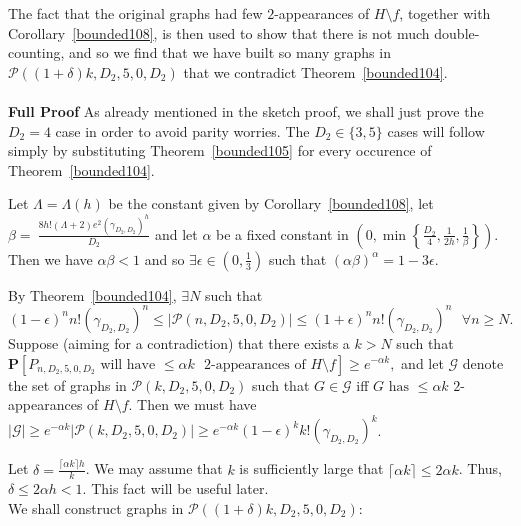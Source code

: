 \documentclass{article}
\newtheorem{Proof of Theorem}{Proof of Theorem}
\begin{document}
The fact that the original graphs had few $2$-appearances of $H \setminus f$,
together with Corollary~\ref{bounded108},
is then used to show that there is not much double-counting,
and so we find that we have built so many graphs in $\mathcal{P}((1+\delta)k,D_{2},5,0,D_{2})$
that we contradict Theorem~\ref{bounded104}. \\
\\
\textbf{Full Proof}
As already mentioned in the sketch proof,
we shall just prove the $D_{2}=4$ case in order to avoid parity worries.
The $D_{2} \in \{ 3,5 \}$ cases will follow simply by substituting Theorem~\ref{bounded105} 
for every occurence of Theorem~\ref{bounded104}.

Let $\Lambda \!=\! \Lambda(h)$ be the constant given by Corollary~\ref{bounded108},
let $\beta \!=~\!\!\frac{ 8h! (\Lambda + 2) e^{2} \left( \gamma_{D_{2},D_{2}} \right)^{h} }{D_{2}}$
and let $\alpha$ be a fixed constant in 
$\left( 0, \min \left\{ \frac{D_{2}}{4}, \frac{1}{2h}, \frac{1}{\beta} \right\} \right)$.
Then we have $\alpha \beta <1$ 
and so $\exists \epsilon \in \left( 0,\frac{1}{3} \right)$ such that $(\alpha \beta)^{\alpha} = 1-3 \epsilon$.

By Theorem~\ref{bounded104},
$\exists N$ such that
\begin{equation} \label{eq:gr2}
(1-\epsilon)^{n}n! \left( \gamma_{D_{2},D_{2}} \right)^{n}
\leq |\mathcal{P}(n,D_{2},5,0,D_{2})|
\leq (1+\epsilon)^{n}n! \left( \gamma_{D_{2},D_{2}} \right)^{n} 
\textrm{ } \forall n \geq N.
\end{equation}
Suppose (aiming for a contradiction) that there exists a $k>N$ such that 
$
\mathbf{P} [P_{n,D_{2},5,0,D_{2}} \textrm{ will have } \leq \alpha k \textrm{ $2$-appearances of } H \setminus f] 
\geq e^{-\alpha k},
$
and let $\mathcal{G}$ denote the set of graphs in $\mathcal{P}(k,D_{2},5,0,D_{2})$ such that
$G \in \mathcal{G}$ iff 
$G \textrm{ has } \leq \alpha k$ $2$-appearances of $H \setminus f$.
Then we must have 
$|\mathcal{G}| \geq e^{-\alpha k} |\mathcal{P}(k,D_{2},5,0,D_{2})| \geq 
e^{-\alpha k} (1-\epsilon)^{k}k! \left( \gamma_{D_{2},D_{2}} \right)^{k}$. 

Let $\delta = \frac{\lceil \alpha k \rceil h}{k}$.
We may assume that $k$ is sufficiently large that 
$\lceil \alpha k \rceil \leq 2 \alpha k$.
Thus, $\delta \leq 2 \alpha h < 1$. \label{delta2}
This fact will be useful later. \\

We shall construct graphs in $\mathcal{P}((1+\delta)k,D_{2},5,0,D_{2})$:
\end{document}
